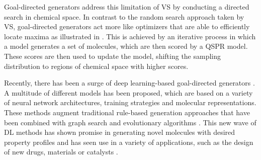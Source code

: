 Goal-directed generators address this limitation of \ac{VS} by conducting a directed search in chemical
space. In contrast to the random search approach taken by \ac{VS},
goal-directed generators act more like optimizers that are able to efficiently locate maxima as
illustrated in . This is achieved by an iterative process in
which a model generates a set of molecules, which are then scored by a \ac{QSPR} model. These scores
are then used to update the model, shifting the sampling distribution to regions of chemical space
with higher scores.

Recently, there has been a surge of deep learning-based goal-directed generators
\citep{eltonDeepLearningMolecular2019,sanchez-lengelingInverseMolecularDesign2018,duMachineLearningaidedGenerative2024}.
A multitude of different models has been proposed, which are based on a variety of neural network
architectures, training strategies and molecular representations. These methods augment traditional
rule-based generation approaches that have been combined with graph search and evolutionary
algorithms \citep{schneiderComputerbasedNovoDesign2005,schneiderNovoMolecularDesign2013}. This new
wave of \ac{DL} methods has shown promise in generating novel molecules with desired
property profiles and has seen use in a variety of applications, such as the design of new drugs,
materials or catalysts \citep{zhavoronkovDeepLearningEnables2019,anstineGenerativeModelsEmerging2023,zahrtPredictionHigherselectivityCatalysts2019,daveAutonomousDiscoveryBattery2020,kimDatadrivenElectrolyteDesign2023,moonActiveLearningGuides2024}.

